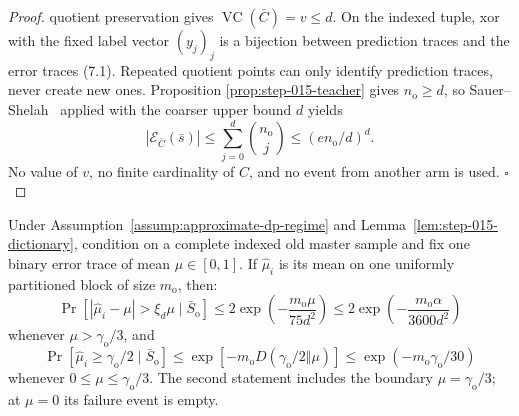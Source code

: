\begin{proof}
 quotient preservation gives
\(\operatorname{VC}(\bar C)=v\le d\). On the indexed tuple, xor with the
fixed label vector \((y_j)_j\) is a bijection between prediction traces and
the error traces (7.1). Repeated quotient points can only identify
prediction traces, never create new ones. Proposition
\ref{prop:step-015-teacher} gives \(n_{\mathrm o}\ge d\), so
Sauer--Shelah~\citep{sauer1972} applied with the coarser upper bound \(d\) yields
\[
|\mathcal E_{\bar C}(\bar s)|
\le\sum_{j=0}^d\binom{n_{\mathrm o}}j
\le(en_{\mathrm o}/d)^d.
\]
No value of \(v\), no finite cardinality of \(C\), and no event from
another arm is used. \(\square\)


\end{proof}

\begin{lemma}\label{lem:step-015-tails}
Under Assumption~\ref{assump:approximate-dp-regime} and
Lemma~\ref{lem:step-015-dictionary}, condition on a complete indexed old
master sample and fix one binary error trace of mean
\(\mu\in[0,1]\). If \(\widehat\mu_i\) is its mean on one uniformly
partitioned block of size \(m_{\mathrm o}\), then:
\[
\Pr\!\left[
|\widehat\mu_i-\mu|>\xi_d\mu\mid\bar S_{\mathrm o}
\right]
\le2\exp\!\left(-\frac{m_{\mathrm o}\mu}{75d^2}\right)
\le2\exp\!\left(-\frac{m_{\mathrm o}\alpha}{3600d^2}\right)
\tag{8.1}
\]
whenever \(\mu>\gamma_{\mathrm o}/3\), and
\[
\Pr[\widehat\mu_i\ge\gamma_{\mathrm o}/2\mid\bar S_{\mathrm o}]
\le\exp[-m_{\mathrm o}
D(\gamma_{\mathrm o}/2\Vert\mu)]
\le\exp(-m_{\mathrm o}\gamma_{\mathrm o}/30)
\tag{8.2}
\]
whenever \(0\le\mu\le\gamma_{\mathrm o}/3\). The second statement includes
the boundary \(\mu=\gamma_{\mathrm o}/3\); at \(\mu=0\) its failure event
is empty.


\end{lemma}

